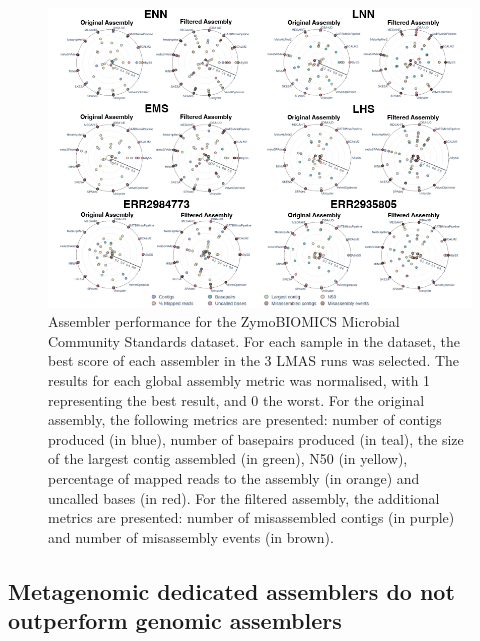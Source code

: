 \begin{figure}[h!]
\centering
\includegraphics[width=\textwidth]{figures/chapter 5/Figure 4.png}
\caption{Assembler performance for the ZymoBIOMICS Microbial Community Standards dataset. For each sample in the dataset, the best score of each assembler in the 3 LMAS runs was selected. The results for each global assembly metric was normalised, with 1 representing the best result, and 0 the worst. For the original assembly, the following metrics are presented: number of contigs produced (in blue), number of basepairs produced (in teal), the size of the largest contig assembled (in green), N50 (in yellow), percentage of mapped reads to the assembly (in orange) and uncalled bases (in red).  For the filtered assembly, the additional metrics are presented: number of misassembled contigs (in purple) and number of misassembly events (in brown). }
\label{fig:chap5_figure4}
\end{figure}

\subsection{Metagenomic dedicated assemblers do not outperform genomic assemblers}

